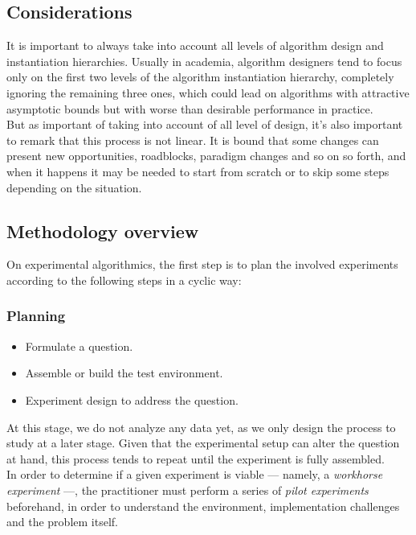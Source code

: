 \subsection{Considerations}
\label{SUBSECTION:EXPERIMENTAL_ALGORITMICS_CONSIDERATIONS}

It is important to always take into account all levels of algorithm design and instantiation hierarchies. Usually in academia, algorithm designers tend to focus only on the first two levels of the algorithm instantiation hierarchy, completely ignoring the remaining three ones, which could lead on algorithms with attractive asymptotic bounds but with worse than desirable performance in practice.\\

But as important of taking into account of all level of design, it's also important to remark that this process is not linear. It is bound that some changes can present new opportunities, roadblocks, paradigm changes and so on so forth, and when it happens it may be needed to start from scratch or to skip some steps depending on the situation.\\


\subsection{Methodology overview}

On experimental algorithmics, the first step is to plan the involved experiments according to the following steps in a cyclic way:\\

\subsubsection{Planning}
\begin{itemize}
    \item Formulate a question.
    \item Assemble or build the test environment.
    \item Experiment design to address the question.
\end{itemize}

At this stage, we do not analyze any data yet, as we only design the process to study at a later stage. Given that the experimental setup can alter the question at hand, this process tends to repeat until the experiment is fully assembled.\\

In order to determine if a given experiment is viable --- namely, a \emph{workhorse experiment} ---, the practitioner must perform a series of \emph{pilot experiments} beforehand, in order to understand the environment, implementation challenges and the problem itself. \\

